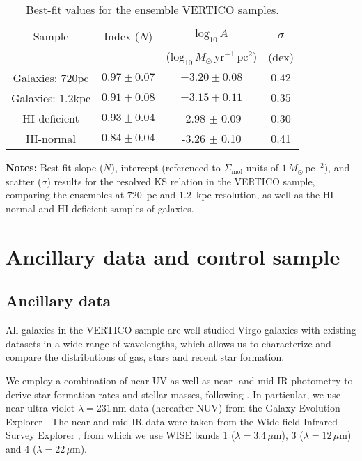 \documentclass[longauth]{aa}
\begin{document}
\begin{table*}
\begin{minipage}{2.0\columnwidth}
    \end{minipage}

\label{tab:previous_results}
\end{table*}

\begin{table}
\centering
\caption{Best-fit values for the ensemble VERTICO samples.}
\begin{tabular}{cccc}
\hline
\hline
Sample & Index ($N$) & $\mathrm{log}_{10}\,A$ & $\sigma$ \\
 & & ($\mathrm{log}_{10}\, M_\odot\,\mathrm{yr}^{-1}\,\mathrm{pc}^{2}$) & (dex) \\
\hline
Galaxies: $720\mathrm{pc}$ & $0.97\pm0.07$ & $-3.20\pm0.08$ & $0.42$\\
Galaxies: $1.2\mathrm{kpc}$ & $0.91\pm0.08$ & $-3.15\pm0.11$ & $0.35$\\
HI-deficient & $0.93\pm0.04$ & -2.98 $\pm$ 0.09 & 0.30 \\
HI-normal & $0.84\pm0.04$ & -3.26 $\pm$ 0.10 & 0.41 \\
\hline
\end{tabular}

    \begin{minipage}{0.95\columnwidth}
        \vspace{1mm}
        {\bf Notes:} Best-fit slope ($N$), intercept (referenced to $\Sigma_\mathrm{mol}$ units of $1\,M_\odot\,\mathrm{pc}^{-2}$), and scatter ($\sigma$) results for the resolved KS relation in the VERTICO sample, comparing the ensembles at $720$~pc and $1.2$~kpc resolution, as well as the HI-normal and HI-deficient samples of galaxies.
    \end{minipage}
\label{tab:global_slopes}
\end{table}


\section{Ancillary data and control sample}
\subsection{Ancillary data}
\label{sec:ancillary}
All galaxies in the VERTICO sample are well-studied Virgo galaxies with existing datasets in a wide range of wavelengths, which allows us to characterize and compare the distributions of gas, stars and recent star formation.

We employ a combination of near-UV as well as near- and mid-IR photometry to derive star formation rates and stellar masses, following \citet{Leroy2019}. In particular, we use near ultra-violet  $\lambda=231$\,nm data (hereafter NUV) from the Galaxy Evolution Explorer \citep[GALEX,][]{Martin2005}. The near and mid-IR data were taken from the Wide-field Infrared Survey Explorer \citep[WISE,][]{Wright2010}, from which we use WISE bands 1 ($\lambda=3.4\,\mu\textrm{m}$), 3 ($\lambda=12\,\mu\textrm{m}$) and 4 ($\lambda=22\,\mu\textrm{m}$).
\end{document}

